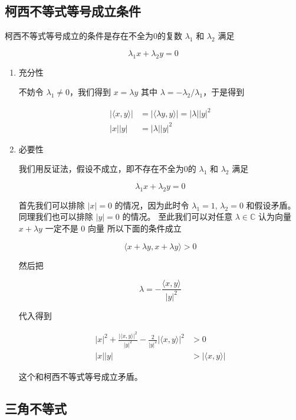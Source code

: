 \documentclass[12pt,a4paper]{ctexart}
\begin{document}
\subsection{柯西不等式等号成立条件}

柯西不等式等号成立的条件是存在不全为0的复数 $\lambda_1$ 和 $\lambda_2$ 满足

\[
\lambda_1 x + \lambda_2 y = 0
\]

\begin{enumerate}
    \item  充分性

不妨令 $\lambda_1 \ne 0$，我们得到 $x = \lambda y$ 其中 $\lambda = -\lambda_2 / \lambda_1 $，于是得到

\begin{align*}
\lvert \langle x,y \rangle \rvert &= \lvert \langle \lambda y, y \rangle \rvert = \lvert \lambda \rvert \lvert y \rvert^2 \\ 
\lvert x \rvert \lvert y \rvert &= \lvert \lambda \rvert \lvert y \rvert^2
\end{align*}

    \item 必要性

我们用反证法，假设不成立，即不存在不全为0的 $\lambda_1$ 和 $\lambda_2$ 满足

\[
\lambda_1 x + \lambda_2 y = 0
\]

首先我们可以排除 $\lvert x \rvert = 0$ 的情况，因为此时令 $\lambda_1 = 1,\, \lambda_2 = 0$ 和假设矛盾。
同理我们也可以排除 $\lvert y \rvert = 0$ 的情况。
至此我们可以对任意 $\lambda \in \mathbb{C}$ 认为向量 $x + \lambda y$ 一定不是 $0$ 向量
所以下面的条件成立

\[
\langle x + \lambda y,x + \lambda y \rangle > 0 
\]

然后把 

\[
\lambda = -\frac{\langle x,y \rangle}{\lvert y\rvert^2}
\]

代入得到

\begin{align*}
\lvert x \rvert^2 + \frac{\lvert \langle x,y\rangle \rvert^2}{\lvert y \rvert ^2} - \frac{2}{\lvert y \rvert^2} \lvert \langle x, y\rangle \rvert^2 & > 0 \\
\lvert x \rvert \lvert y \rvert &> \lvert \langle x,y \rangle \rvert
\end{align*}

这个和柯西不等式等号成立矛盾。


\end{enumerate}

\subsection{三角不等式}
\end{document}
